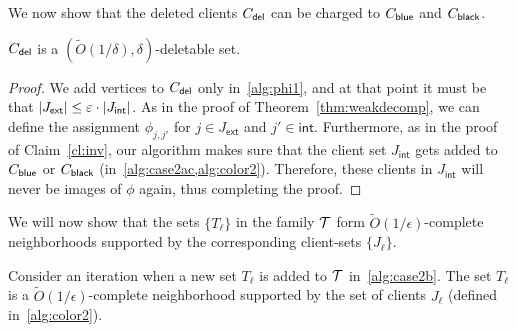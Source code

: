 We now show that the deleted clients $C_{\mathsf{del}}$ can be charged to $C_{\mathsf{blue}}$ and $C_{\mathsf{black}}$.
\begin{claim} \label{cl:phi-augment}
$C_{\mathsf{del}}$ is a $(\tilde{O}(1/\delta),\delta)$-deletable set.
\end{claim}
\begin{proof}
	We add vertices to $C_{\mathsf{del}}$ only in~\cref{alg:phi1}, and at that point it must be that $|J_\mathsf{ext}| \leq \varepsilon\cdot |J_\mathsf{int}|$. 
	As in the proof of Theorem~\ref{thm:weakdecomp}, we can define the assignment $\phi_{j,j'}$ for $j\in J_\mathsf{ext}$ and $j' \in \mathsf{int}$.
Furthermore, as in the proof of Claim~\ref{cl:inv}, our algorithm makes sure that the client set $J_\mathsf{int}$ gets added to $C_{\mathsf{blue}}$ or $C_{\mathsf{black}}$ (in~\cref{alg:case2ac,alg:color2}).
Therefore, these clients in $J_\mathsf{int}$ will never be images of $\phi$ again, thus completing the proof.
\end{proof}


We will now show that the sets $\{T_\ell\}$ in the family ${\cal T}$ form $\tilde{O}(1/\epsilon)$-complete neighborhoods supported by the corresponding client-sets $\{J_\ell\}$.
\begin{lemma} \label{lem:local}
Consider an iteration when a new set $T_\ell$ is added to ${\cal T}$ in~\cref{alg:case2b}. The set $T_\ell$ is a $\tilde{O}(1/\epsilon)$-complete neighborhood supported by the set of clients $J_\ell$ (defined in~\cref{alg:color2}).
\end{lemma}

